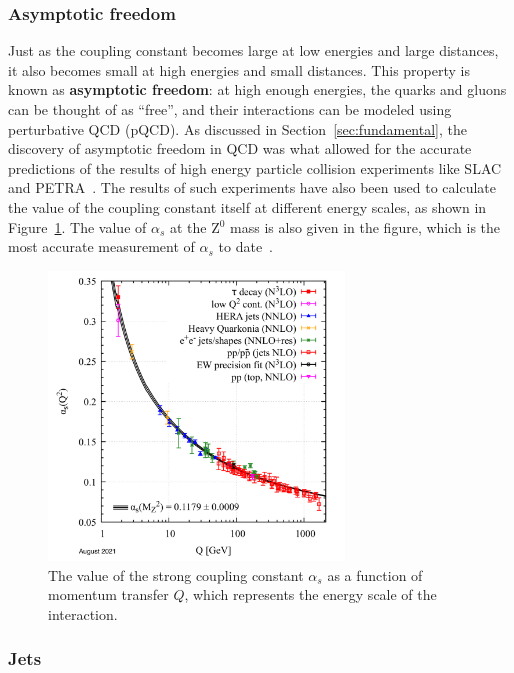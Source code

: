 \subsubsection{Asymptotic freedom}
\label{sec:qcd_asymptotic_freedom}

Just as the coupling constant becomes large at low energies and large distances, it also becomes small at high energies and small distances. This property is known as \textbf{asymptotic freedom}: at high enough energies, the quarks and gluons can be thought of as ``free'', and their interactions can be modeled using perturbative QCD (pQCD). As discussed in Section~\ref{sec:fundamental}, the discovery of asymptotic freedom in QCD was what allowed for the accurate predictions of the results of high energy particle collision experiments like SLAC~\cite{SLAC} and PETRA~\cite{PETRA}. The results of such experiments have also been used to calculate the value of the coupling constant itself at different energy scales, as shown in Figure~\ref{fig:asymptotic_freedom}. The value of $\alpha_s$ at the Z$^0$ mass is also given in the figure, which is the most accurate measurement of $\alpha_s$ to date~\cite{PDG}. 

\begin{figure}
    \centering
    \includegraphics[width=0.7\textwidth]{figures/introduction/running_coupling.png}
    \caption{The value of the strong coupling constant $\alpha_s$ as a function of momentum transfer $Q$, which represents the energy scale of the interaction.}
    \label{fig:asymptotic_freedom}
\end{figure}


\subsubsection{Jets}
\label{sec:jets}

